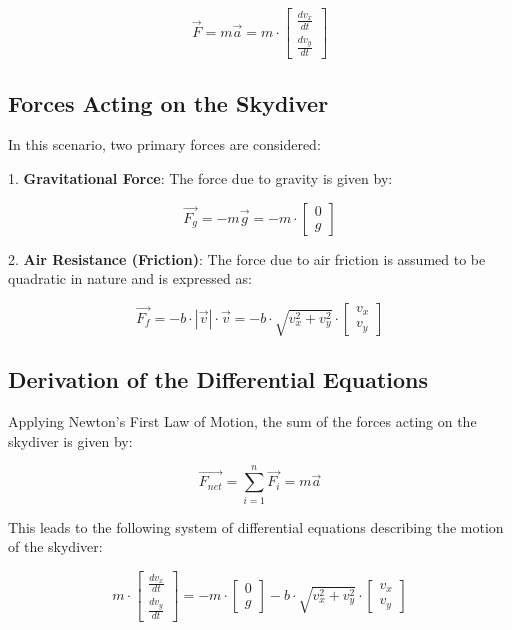 \documentclass{article}
\begin{document}
\[
\vec{F} = m\vec{a} = m \cdot \begin{bmatrix}
\frac{dv_{x}}{dt} \\
\frac{dv_{y}}{dt} 
\end{bmatrix}
\]

\subsection*{Forces Acting on the Skydiver}

In this scenario, two primary forces are considered:

1. \textbf{Gravitational Force}: The force due to gravity is given by:

\[
\vec{F_{g}} = -m\vec{g} = -m \cdot \begin{bmatrix}
0 \\
g
\end{bmatrix}
\]

2. \textbf{Air Resistance (Friction)}: The force due to air friction is assumed to be quadratic in nature and is expressed as:

\[
\vec{F_{f}} = -b \cdot |\vec{v}| \cdot \vec{v} = -b \cdot \sqrt{v_{x}^2 + v_{y}^2} \cdot \begin{bmatrix}
v_{x} \\
v_{y}
\end{bmatrix}
\]

\subsection*{Derivation of the Differential Equations}

Applying Newton's First Law of Motion, the sum of the forces acting on the skydiver is given by:

\[
\vec{F_{net}} = \sum_{i=1}^{n}\vec{F_{i}} = m\vec{a}
\]

This leads to the following system of differential equations describing the motion of the skydiver:

\[
m \cdot \begin{bmatrix}
\frac{dv_{x}}{dt} \\
\frac{dv_{y}}{dt}
\end{bmatrix}
= -m \cdot \begin{bmatrix}
0 \\
g
\end{bmatrix}
- b \cdot \sqrt{v_{x}^2 + v_{y}^2} \cdot \begin{bmatrix}
v_{x} \\
v_{y}
\end{bmatrix}
\]
\end{document}

